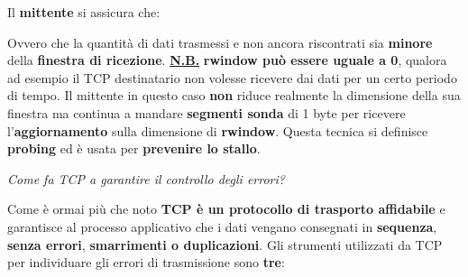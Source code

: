 \documentclass[11pt,a4paper]{article}
\theoremstyle{definition}
\begin{document}
\centerline{}\newline\newline
Il \textbf{mittente} si assicura che:\newline\newline
\centerline{}\newline\newline
Ovvero che la quantità di dati trasmessi e non ancora riscontrati sia \textbf{minore} della \textbf{finestra di ricezione}.\newline
\textbf{\underline{N.B.}} \textbf{rwindow può essere uguale a 0}, qualora ad esempio il TCP destinatario non volesse ricevere dai dati per un certo periodo di tempo. Il mittente in questo caso \textbf{non} riduce realmente la dimensione della sua finestra ma continua a mandare \textbf{segmenti sonda} di 1 byte per ricevere l’\textbf{aggiornamento} sulla dimensione di \textbf{rwindow}. Questa tecnica si definisce \textbf{probing} ed è usata per \textbf{prevenire lo stallo}.
\newpage
\begin{flushleft}
	\textit{Come fa TCP a garantire il controllo degli errori?}
\end{flushleft}
Come è ormai più che noto \textbf{TCP è un protocollo di trasporto affidabile} e garantisce al processo applicativo che i dati vengano consegnati in \textbf{sequenza}, \textbf{senza errori}, \textbf{smarrimenti o duplicazioni}.\newline
Gli strumenti utilizzati da TCP per individuare gli errori di trasmissione sono \textbf{tre}:
\end{document}
